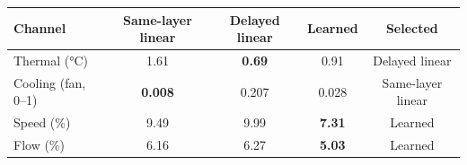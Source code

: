 \begin{tabular}{lcccc}
\toprule
Channel & Same-layer linear & Delayed linear & Learned & Selected \\
\midrule
Thermal (\si{\celsius}) & 1.61 & \textbf{0.69} & 0.91 & Delayed linear \\
Cooling (fan, 0--1) & \textbf{0.008} & 0.207 & 0.028 & Same-layer linear \\
Speed (\%) & 9.49 & 9.99 & \textbf{7.31} & Learned \\
Flow (\%) & 6.16 & 6.27 & \textbf{5.03} & Learned \\
\bottomrule
\end{tabular}

